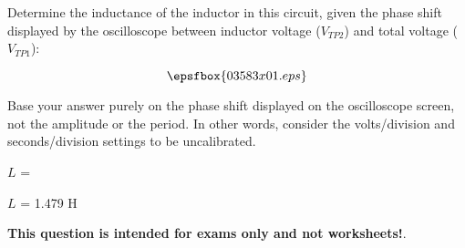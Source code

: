 

Determine the inductance of the inductor in this circuit, given the phase shift displayed by the oscilloscope between inductor voltage ($V_{TP2}$) and total voltage ($V_{TP1}$):

$$\epsfbox{03583x01.eps}$$

Base your answer purely on the phase shift displayed on the oscilloscope screen, not the amplitude or the period.  In other words, consider the volts/division and seconds/division settings to be uncalibrated.

\vskip 10pt

$L$ = 







$L$ = 1.479 H







{\bf This question is intended for exams only and not worksheets!}.



